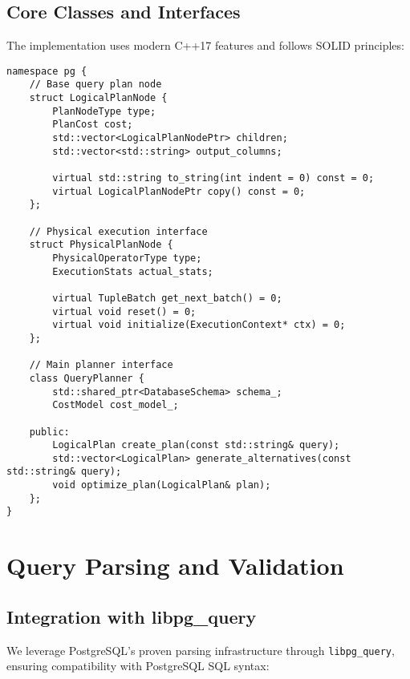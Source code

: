\documentclass[12pt,a4paper]{article}
\begin{document}
\subsection{Core Classes and Interfaces}

The implementation uses modern C++17 features and follows SOLID principles:

\begin{lstlisting}[style=cpp, caption=Core Interface Definitions]
namespace pg {
    // Base query plan node
    struct LogicalPlanNode {
        PlanNodeType type;
        PlanCost cost;
        std::vector<LogicalPlanNodePtr> children;
        std::vector<std::string> output_columns;
        
        virtual std::string to_string(int indent = 0) const = 0;
        virtual LogicalPlanNodePtr copy() const = 0;
    };
    
    // Physical execution interface
    struct PhysicalPlanNode {
        PhysicalOperatorType type;
        ExecutionStats actual_stats;
        
        virtual TupleBatch get_next_batch() = 0;
        virtual void reset() = 0;
        virtual void initialize(ExecutionContext* ctx) = 0;
    };
    
    // Main planner interface
    class QueryPlanner {
        std::shared_ptr<DatabaseSchema> schema_;
        CostModel cost_model_;
        
    public:
        LogicalPlan create_plan(const std::string& query);
        std::vector<LogicalPlan> generate_alternatives(const std::string& query);
        void optimize_plan(LogicalPlan& plan);
    };
}
\end{lstlisting}

\section{Query Parsing and Validation}

\subsection{Integration with libpg\_query}

We leverage PostgreSQL's proven parsing infrastructure through \texttt{libpg\_query}, ensuring compatibility with PostgreSQL SQL syntax:
\end{document}
